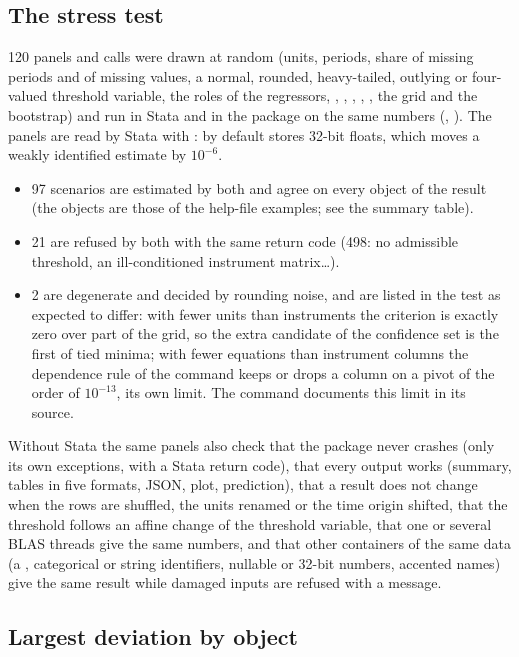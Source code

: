 \subsection{The stress test}
120 panels and calls were drawn at random (units, periods, share of missing periods and of
missing values, a normal, rounded, heavy-tailed, outlying or four-valued threshold variable, the
roles of the regressors, , , , , , the grid and the
bootstrap) and run in Stata and in the package on the same numbers (,
). The panels are read by Stata with : by default
 stores 32-bit floats, which moves a weakly identified estimate by $10^{-6}$.
\begin{itemize}
\item 97 scenarios are estimated by both and agree on every object of the result
(the objects are those of the help-file examples; see the summary table).
\item 21 are refused by both with the same return code (498: no admissible threshold, an
ill-conditioned instrument matrix\ldots).
\item 2 are degenerate and decided by rounding noise, and are listed in the test as expected
to differ: with fewer units than instruments the criterion is exactly zero over part of the grid, so
the extra candidate of the confidence set is the first of tied minima; with fewer equations than
instrument columns the dependence rule of the command keeps or drops a column on a pivot of the order
of $10^{-13}$, its own limit. The command documents this limit in its source.
\end{itemize}
Without Stata the same panels also check that the package never crashes (only its own exceptions,
with a Stata return code), that every output works (summary, tables in five formats, JSON, plot,
prediction), that a result does not change when the rows are shuffled, the units renamed or the time
origin shifted, that the threshold follows an affine change of the threshold variable, that one or
several BLAS threads give the same numbers, and that other containers of the same data (a
, categorical or string identifiers, nullable or 32-bit numbers, accented names)
give the same result while damaged inputs are refused with a message.

\subsection{Largest deviation by object}

